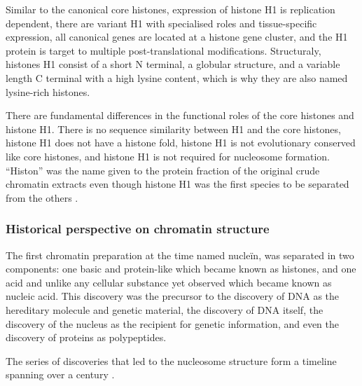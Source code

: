       Similar to the canonical core histones, expression of histone H1 is
      replication dependent, there are variant H1 with specialised
      roles and tissue-specific expression, all canonical genes
      are located at a histone gene cluster, and the H1 protein
      is target to multiple post-translational modifications.
      Structuraly, histones H1 consist of a short N terminal, a globular
      structure, and a variable length C terminal with a high lysine
      content, which is why they are also named lysine-rich histones.

      There are fundamental differences in the functional roles of
      the core histones and histone H1.
      There is no sequence similarity between H1 and the core histones,
      histone H1 does not have a histone fold,
      histone H1 is not evolutionary conserved like core histones,
      and histone H1 is not required for nucleosome formation.
      ``Histon'' was the name given to the protein fraction of
      the original crude chromatin extracts \citep{kossel1884-histones}
      even though histone H1 was the first species to be separated from
      the others \citep{stedman1951main-histones-separation}.

    \subsubsection{Historical perspective on chromatin structure}

      The first chromatin preparation \citep{kossel1884-histones}
      at the time named nucleïn, was
      separated in two components: one basic and protein-like which
      became known as histones, and one acid and unlike any cellular
      substance yet observed which became known as nucleic acid.
      This discovery was the precursor to the discovery of DNA as the hereditary
      molecule and genetic material, the discovery of DNA itself,
      the discovery of the nucleus as the recipient for genetic
      information, and even the discovery of proteins as polypeptides.

      The series of discoveries that led to the nucleosome
      structure form a timeline spanning over a century
      \citep{vanHolde-chapter1}.


